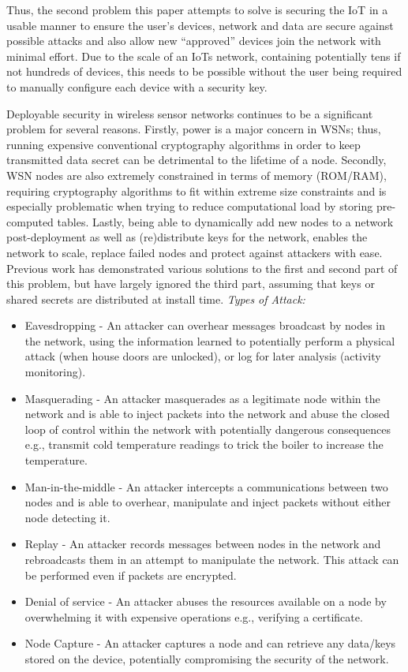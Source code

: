 \documentclass[conference]{./sty/IEEEtran}
\begin{document}
Thus, the second problem this paper attempts to solve is securing the IoT in a usable manner to ensure the user's devices, network and data are secure against possible attacks and also allow new ``approved'' devices join the network with minimal effort. Due to the scale of an IoTs network, containing potentially tens if not hundreds of devices, this needs to be possible without the user being required to manually configure each device with a security key.

Deployable security in wireless sensor networks continues to be a significant problem for several reasons. Firstly, power is a major concern in WSNs; thus, running expensive conventional cryptography algorithms in order to keep transmitted data secret can be detrimental to the lifetime of a node. Secondly, WSN nodes are also extremely constrained in terms of memory (ROM/RAM), requiring cryptography algorithms to fit within extreme size constraints and is especially problematic when trying to reduce computational load by storing pre-computed tables. Lastly, being able to dynamically add new nodes to a network post-deployment as well as (re)distribute keys for the network, enables the network to scale, replace failed nodes and protect against attackers with ease. Previous work has demonstrated various solutions to the first and second part of this problem\cite{TinySec,MiniSec,TinyECC}, but have largely ignored the third part, assuming that keys or shared secrets are distributed at install time.
\textit{Types of Attack:}
\begin{itemize}
  \item Eavesdropping - An attacker can overhear messages broadcast by nodes in the network, using the information learned to potentially perform a physical attack (when house doors are unlocked), or log for later analysis (activity monitoring).  
  \item Masquerading - An attacker masquerades as a legitimate node within the network and is able to inject packets into the network and abuse the closed loop of control within the network with potentially dangerous consequences e.g., transmit cold temperature readings to trick the boiler to increase the temperature.
  \item Man-in-the-middle - An attacker intercepts a communications between two nodes and is able to overhear, manipulate and inject packets without either node detecting it. 
  \item Replay - An attacker records messages between nodes in the network and rebroadcasts them in an attempt to manipulate the network. This attack can be performed even if packets are encrypted. 
  \item Denial of service - An attacker abuses the resources available on a node by overwhelming it with expensive operations e.g., verifying a certificate.
  \item Node Capture - An attacker captures a node and can retrieve any data/keys stored on the device, potentially compromising the security of the network.
\end{itemize}
\end{document}

